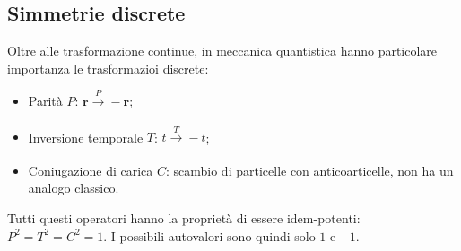 \subsection{Simmetrie discrete}
Oltre alle trasformazione continue, in meccanica quantistica hanno particolare importanza le trasformazioi discrete: 
\begin{itemize}
    \item Parità $P$: $\mathbf{r}\xrightarrow[]{P}-\mathbf{r}$;
    \item Inversione temporale $T$: $t\xrightarrow[]{T}-t$;
    \item Coniugazione di carica $C$: scambio di particelle con anticoarticelle, non ha un analogo classico.
\end{itemize}
Tutti questi operatori hanno la proprietà di essere idem-potenti: $P^2=T^2=C^2=1$. I possibili autovalori sono quindi solo $1$ e $-1$.
